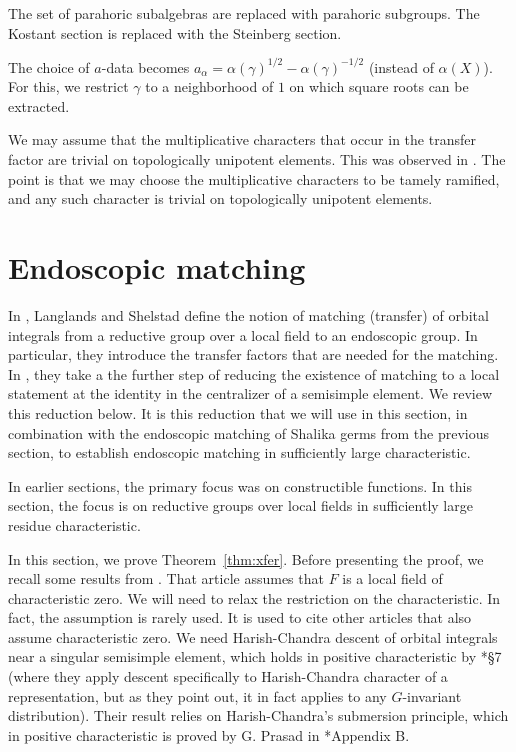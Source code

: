 \documentclass[12pt]{amsart}
\theoremstyle{plain}
\theoremstyle{definition}
\begin{document}
The set of parahoric subalgebras are replaced with parahoric subgroups.
The Kostant section is replaced with the Steinberg section.  

The
choice of $a$-data becomes $a_\alpha = \alpha(\gamma)^{1/2} -
\alpha(\gamma)^{-1/2}$ (instead of $\alpha(X)$).  For this, we
restrict $\gamma$ to a neighborhood of $1$ on which square roots can
be extracted.

We may assume that the multiplicative characters that occur in the
transfer factor are trivial on topologically unipotent elements.  This
was observed in \cite{hales1993simple}.  The point is that we may choose
the multiplicative characters to be tamely ramified, and any such
character is trivial on topologically unipotent elements.

\section{Endoscopic matching}

In \cite{LSxf}, Langlands and Shelstad define the notion of matching
(transfer) of orbital integrals from a reductive group over a local
field to an endoscopic group.  In particular, they introduce the
transfer factors that are needed for the matching.  In \cite{LSd},
they take a the further step of reducing the existence of matching to
a local statement at the identity in the centralizer of a semisimple
element.  We review this reduction below.  It is this reduction that
we will use in this section, in combination with the endoscopic
matching of Shalika germs from the previous section, to establish
endoscopic matching in sufficiently large characteristic.

In earlier sections, the primary focus was on constructible
functions.  In this section, the focus is on reductive groups over
local fields in sufficiently large residue characteristic.


In this section, we prove Theorem~\ref{thm:xfer}.
Before presenting the proof, we recall some results from \cite{LSd}.
That article assumes that $F$ is a local field of characteristic zero.
We will need to relax the restriction on the characteristic.  In fact,
the assumption is rarely used.  It is used to cite other articles that
also assume characteristic zero.  We need Harish-Chandra descent of
orbital integrals near a singular semisimple element, which holds in
positive characteristic by \cite{adler-korman}*{\S 7} 
(where they apply descent specifically to Harish-Chandra character of a 
representation, but as they point out, it in fact applies to any 
$G$-invariant distribution). Their result relies on Harish-Chandra's submersion 
principle, which in positive characteristic is proved by G. Prasad 
in \cite{adler-debacker:mktheory}*{Appendix B}.
\end{document}

